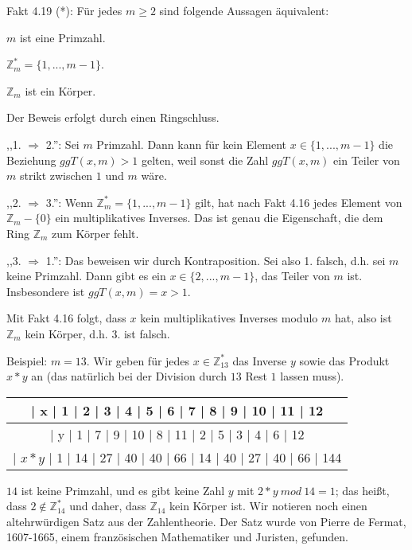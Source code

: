 \documentclass[a4paper]{article}
\begin{document}
\begin{multicols}{3}
    Fakt 4.19 (*): Für jedes $m\geq 2$ sind folgende Aussagen äquivalent:
    \begin{enumerate*}
        \item $m$ ist eine Primzahl.
        \item $\mathbb{Z}^*_m=\{ 1 ,...,m-1\}$.
        \item $\mathbb{Z}_m$ ist ein Körper.
    \end{enumerate*}

    Der Beweis erfolgt durch einen Ringschluss.
    \begin{itemize*}
        \item ,,1. $\Rightarrow$ 2.'': Sei $m$ Primzahl. Dann kann für kein Element $x\in\{1 ,...,m-1\}$ die Beziehung $ggT(x,m)>1$ gelten, weil sonst die Zahl $ggT(x,m)$ ein Teiler von $m$ strikt zwischen $1$ und $m$ wäre.
        \item ,,2. $\Rightarrow$ 3.'': Wenn $\mathbb{Z}^*_m=\{1 ,...,m-1\}$ gilt, hat nach Fakt 4.16 jedes Element von $\mathbb{Z}_m -\{0\}$ ein multiplikatives Inverses. Das ist genau die Eigenschaft, die dem Ring $\mathbb{Z}_m$ zum Körper fehlt.
        \item ,,3. $\Rightarrow$ 1.'': Das beweisen wir durch Kontraposition. Sei also 1. falsch, d.h. sei $m$ keine Primzahl. Dann gibt es ein $x\in\{2,...,m-1\}$, das Teiler von $m$ ist. Insbesondere ist $ggT(x,m) =x >1$.
        \item Mit Fakt 4.16 folgt, dass $x$ kein multiplikatives Inverses modulo $m$ hat, also ist $\mathbb{Z}_m$ kein Körper, d.h. 3. ist falsch.
    \end{itemize*}

    Beispiel: $m=13$. Wir geben für jedes $x\in\mathbb{Z}^*_{13}$ das Inverse $y$ sowie das Produkt $x*y$ an (das natürlich bei der Division durch $13$ Rest $1$ lassen muss).
    \begin{tabular}{c}
    | x   | 1  | 2  | 3  | 4  | 5  | 6  | 7  | 8  | 9  | 10 | 11 | 12 \\\hline
    | y   | 1  | 7  | 9  | 10 | 8  | 11 | 2  | 5  | 3  | 4  | 6  | 12 \\
    | $x*y$ | 1  | 14 | 27 | 40 | 40 | 66 | 14 | 40 | 27 | 40 | 66 | 144 
    \end{tabular}

    $14$ ist keine Primzahl, und es gibt keine Zahl $y$ mit $2*y\ mod\ 14 = 1$; das heißt, dass $2\not\in\mathbb{Z}^*_{14}$ und daher, dass $\mathbb{Z}_{14}$ kein Körper ist.
    Wir notieren noch einen altehrwürdigen Satz aus der Zahlentheorie. Der Satz wurde von Pierre de Fermat, 1607-1665, einem französischen Mathematiker und Juristen, gefunden.


\end{multicols}
\end{document}
